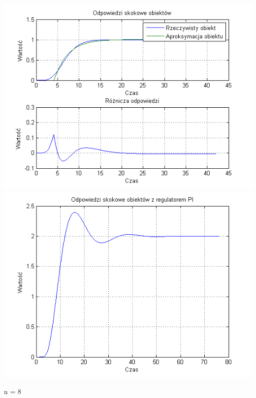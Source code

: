 \documentclass[10pt,a4paper]{article}
\begin{document}
\begin{center}
\includegraphics[scale=1]{images/jeden/skrypt_113.png}\\
\includegraphics[scale=1]{images/jeden/skrypt_114.png}\\
\end{center}
\newpage
n = 8
\end{document}
